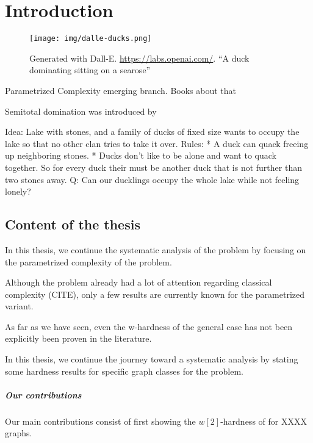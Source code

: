 \chapter{Introduction}\label{ch:introduction}

\begin{wrapfigure}{R}{0.35\textwidth}
        \texttt{[image: img/dalle-ducks.png]}
        \captionsetup{textformat=empty,labelformat=blank}
        \caption{Generated with Dall-E. \url{https://labs.openai.com/}. ``A duck dominating sitting on a searose''}
\end{wrapfigure}

Parametrized Complexity emerging branch. Books about that

Semitotal domination was introduced by 


Idea:  Lake with stones, and a family of ducks of fixed size wants to occupy the lake so that no other clan tries to take it over.
Rules: 
* A duck can quack freeing up neighboring stones.
* Ducks don't like to be alone and want to quack together. So for every duck their must be another duck that is not further than two stones away.
Q: Can our ducklings occupy the whole lake while not feeling lonely?


\section{Content of the thesis}

In this thesis, we continue the systematic analysis of the \sdom problem by focusing on the parametrized complexity of the problem. 

Although the problem already had a lot of attention regarding classical complexity (CITE), only a few results are currently known for the parametrized variant. 

As far as we have seen, even the w-hardness of the general case has not been explicitly been proven in the literature. 

In this thesis, we continue the journey toward a systematic analysis by stating some hardness results for specific graph classes for the problem.

\paragraph{Our contributions}

Our main contributions consist of first showing the $w[2]$-hardness of \sdom for XXXX graphs.

